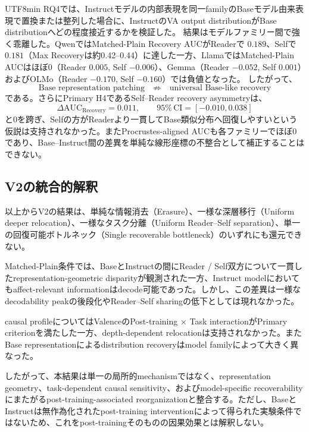 \documentclass{article} %
\begin{document}
\begin{CJK*}{UTF8}{min}
RQ4では、Instructモデルの内部表現を同一familyのBaseモデル由来表現で置換または整列した場合に、InstructのVA output distributionがBase distributionへどの程度接近するかを検証した。
結果はモデルファミリー間で強く乖離した。QwenではMatched-Plain Recovery AUCがReaderで $0.189$、Selfで $0.181$（Max Recoveryは約0.42--0.44）に達した一方、LlamaではMatched-Plain AUCはほぼ0（Reader $0.005$, Self $-0.006$）、Gemma（Reader $-0.052$, Self $0.001$）およびOLMo（Reader $-0.170$, Self $-0.160$）では負値となった。
したがって、
\[
\text{Base representation patching}
\quad\not\Rightarrow\quad
\text{universal Base-like recovery}
\]
である。さらにPrimary H4であるSelf--Reader recovery asymmetryは、
\[
\Delta\text{AUC}_{\mathrm{Recovery}} = 0.011, \qquad 95\%\,\text{CI} = [-0.010, 0.038]
\]
と0を跨ぎ、Selfの方がReaderより一貫してBase類似分布へ回復しやすいという仮説は支持されなかった。またProcrustes-aligned AUCも各ファミリーでほぼ0であり、Base--Instruct間の差異を単純な線形座標の不整合として補正することはできない。


\subsection{V2の統合的解釈}

以上からV2の結果は、単純な情報消去（Erasure）、一様な深層移行（Uniform deeper relocation）、一様なタスク分離（Uniform Reader--Self separation）、単一の回復可能ボトルネック（Single recoverable bottleneck）のいずれにも還元できない。

Matched-Plain条件では、BaseとInstructの間にReader / Self双方について一貫したrepresentation-geometric disparityが観測された一方、Instruct modelにおいてもaffect-relevant informationはdecode可能であった。しかし、この差異は一様なdecodability peakの後段化やReader--Self sharingの低下としては現れなかった。

causal profileについてはValenceのPost-training \(\times\) Task interactionがPrimary criterionを満たした一方、depth-dependent relocationは支持されなかった。またBase representationによるdistribution recoveryはmodel familyによって大きく異なった。

したがって、本結果は単一の局所的mechanismではなく、representation geometry、task-dependent causal sensitivity、およびmodel-specific recoverabilityにまたがるpost-training-associated reorganizationと整合する。ただし、BaseとInstructは無作為化されたpost-training interventionによって得られた実験条件ではないため、これをpost-trainingそのものの因果効果とは解釈しない。




\end{CJK*}
\end{document}
